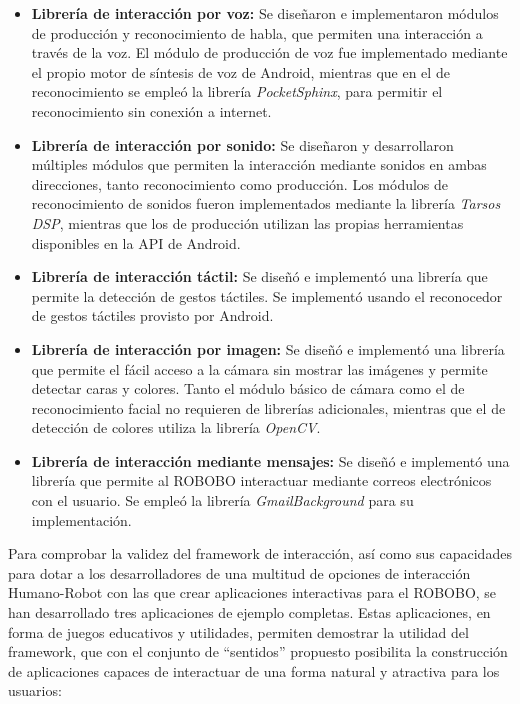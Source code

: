 \begin{itemize}
 	\item \textbf{Librería de interacción por voz:} Se diseñaron e implementaron módulos de producción y reconocimiento de habla, que permiten una interacción a través de la voz. El módulo de producción de voz fue implementado mediante el propio motor de síntesis de voz de Android, mientras que en el de reconocimiento se empleó la librería \textit{PocketSphinx}, para permitir el reconocimiento sin conexión a internet. 
	\item \textbf{Librería de interacción por sonido:} Se diseñaron y desarrollaron múltiples módulos que permiten la interacción mediante sonidos en ambas direcciones, tanto reconocimiento como producción. Los módulos de reconocimiento de sonidos fueron implementados mediante la librería \textit{Tarsos DSP}, mientras que los de producción utilizan las propias herramientas disponibles en la API de Android.
	\item \textbf{Librería de interacción táctil:} Se diseñó e implementó una librería que permite la detección de gestos táctiles. Se implementó usando el reconocedor de gestos táctiles provisto por Android.
	\item \textbf{Librería de interacción por imagen:} Se diseñó e implementó una librería que permite el fácil acceso a la cámara sin mostrar las imágenes y permite detectar caras y colores. Tanto el módulo básico de cámara como el de reconocimiento facial no requieren de librerías adicionales, mientras que el de detección de colores utiliza la librería \textit{OpenCV}.
	\item \textbf{Librería de interacción mediante mensajes:} Se diseñó e implementó una librería que permite al ROBOBO interactuar mediante correos electrónicos con el usuario. Se empleó la librería \textit{GmailBackground} para su implementación.
 \end{itemize} 
 
Para comprobar la validez del framework de interacción, así como sus capacidades para dotar a los desarrolladores de una multitud de opciones de interacción Humano-Robot con las que crear aplicaciones interactivas para el ROBOBO, se han desarrollado tres aplicaciones de ejemplo completas. Estas aplicaciones, en forma de juegos educativos y utilidades, permiten demostrar la utilidad del framework, que con el conjunto de “sentidos” propuesto posibilita la construcción de aplicaciones capaces de interactuar de una forma natural y atractiva para los usuarios: 

